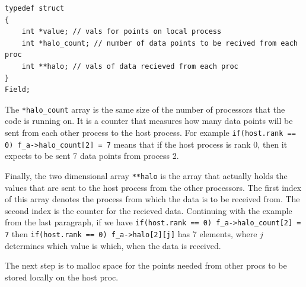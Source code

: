 \documentclass[pdftex,12pt,a4paper]{article}
\begin{document}
\begin{lstlisting}
typedef struct
{
	int *value;	// vals for points on local process
	int *halo_count; // number of data points to be recived from each proc
	int **halo;	// vals of data recieved from each proc	
}
Field;
\end{lstlisting}

The \verb|*halo_count| array is the same size of the number of processors that the code is running on. It is a counter that measures how many data points will be sent from each other process to the host process. For example \verb|if(host.rank == 0) f_a->halo_count[2] = 7| means that if the host process is rank 0, then it expects to be sent 7 data points from process 2.

Finally, the two dimensional array \verb|**halo| is the array that actually holds the values that are sent to the host process from the other processors. The first index of this array denotes the process from which the data is to be received from. The second index is the counter for the recieved data. Continuing with the example from the last paragraph, if we have \verb|if(host.rank == 0) f_a->halo_count[2] = 7| then \verb|if(host.rank == 0) f_a->halo[2][j]| has 7 elements, where $j$ determines which value is which, when the data is received.

The next step is to malloc space for the points needed from other procs to be stored locally on the host proc.
\end{document}
